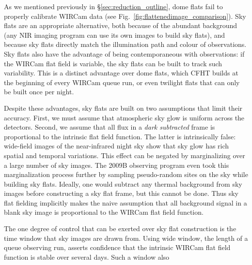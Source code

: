 \documentclass[iop]{emulateapj}
\newcommand{\Fig}[1]{Fig.~\ref{fig:#1}}  %
\newcommand{\Sec}[1]{\S\ref{sec:#1}}  %
\begin{document}
As we mentioned previously in \Sec{reduction_outline}, dome flats fail to properly calibrate WIRCam data (see \Fig{flattenedimage_comparison}).
Sky flats are an appropriate alternative, both because of the abundant background (any NIR imaging program can use its own images to build sky flats), and because sky flats directly match the illumination path and colour of observations.
Sky flats also have the advantage of being contemporaneous with observations: if the WIRCam flat field is variable, the sky flats can be built to track such variability.
This is a distinct advantage over dome flats, which CFHT builds at the beginning of every WIRCam queue run, or even twilight flats that can only be built once per night.

Despite these advantages, sky flats are built on two assumptions that limit their accuracy.
First, we must assume that atmospheric sky glow is uniform across the detectors.
Second, we assume that all flux in a \emph{dark subtracted} frame is proportional to the intrinsic flat field function.
The latter is intrinsically false: wide-field images of the near-infrared night sky show that sky glow has rich spatial and temporal variations.
This effect can be negated by marginalizing over a large number of sky images.
The 2009B observing program even took this marginalization process further by sampling pseudo-random sites on the sky while building sky flats.
Ideally, one would subtract any thermal background from sky images before constructing a sky flat frame, but this cannot be done.
Thus sky flat fielding implicitly makes the naive assumption that all background signal in a blank sky image is proportional to the WIRCam flat field function.

The one degree of control that can be exerted over sky flat construction is the time window that sky images are drawn from.
Using wide window, the length of a queue observing run, asserts confidence that the intrinsic WIRCam flat field function is stable over several days.
Such a window also 
\end{document}
